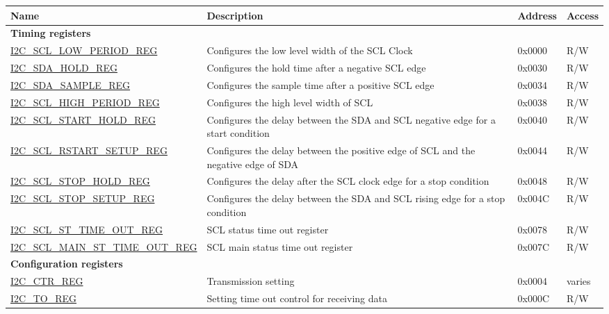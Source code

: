\begin{longtable}{ | p{6cm} | p{7cm} | p{1.3cm} | p{1cm} | }
    \hline\rowcolor{lightgray}
    Name & Description &  Address & Access \\ \hline
    \endhead
    \multicolumn{4}{|l|}{\textbf{Timing registers}} \\ \hline
    \hyperref[regdesc:I2CSCLLOWPERIODREG]{I2C\_SCL\_LOW\_PERIOD\_REG} & Configures the low level width of the SCL Clock & 0x0000 & R/W \\ \hline
    \hyperref[regdesc:I2CSDAHOLDREG]{I2C\_SDA\_HOLD\_REG} & Configures the hold time after a negative SCL edge & 0x0030 & R/W \\ \hline
    \hyperref[regdesc:I2CSDASAMPLEREG]{I2C\_SDA\_SAMPLE\_REG} & Configures the sample time after a positive SCL edge & 0x0034 & R/W \\ \hline
    \hyperref[regdesc:I2CSCLHIGHPERIODREG]{I2C\_SCL\_HIGH\_PERIOD\_REG} & Configures the high level width of SCL & 0x0038 & R/W \\ \hline
    \hyperref[regdesc:I2CSCLSTARTHOLDREG]{I2C\_SCL\_START\_HOLD\_REG} & Configures the delay between the SDA and SCL negative edge for a start condition & 0x0040 & R/W \\ \hline
    \hyperref[regdesc:I2CSCLRSTARTSETUPREG]{I2C\_SCL\_RSTART\_SETUP\_REG} & Configures the delay between the positive edge of SCL and the negative edge of SDA & 0x0044 & R/W \\ \hline
    \hyperref[regdesc:I2CSCLSTOPHOLDREG]{I2C\_SCL\_STOP\_HOLD\_REG} & Configures the delay after the SCL clock edge for a stop condition & 0x0048 & R/W \\ \hline
    \hyperref[regdesc:I2CSCLSTOPSETUPREG]{I2C\_SCL\_STOP\_SETUP\_REG} & Configures the delay between the SDA and SCL rising edge for a stop condition & 0x004C & R/W \\ \hline
    \hyperref[regdesc:I2CSCLSTTIMEOUTREG]{I2C\_SCL\_ST\_TIME\_OUT\_REG} & SCL status time out register & 0x0078 & R/W \\ \hline
    \hyperref[regdesc:I2CSCLMAINSTTIMEOUTREG]{I2C\_SCL\_MAIN\_ST\_TIME\_OUT\_REG} & SCL main status time out register & 0x007C & R/W \\ \hline
    \multicolumn{4}{|l|}{\textbf{Configuration registers}} \\ \hline
    \hyperref[regdesc:I2CCTRREG]{I2C\_CTR\_REG} & Transmission setting & 0x0004 & varies \\ \hline
    \hyperref[regdesc:I2CTOREG]{I2C\_TO\_REG} & Setting time out control for receiving data & 0x000C & R/W \\ \hline

\end{longtable}
